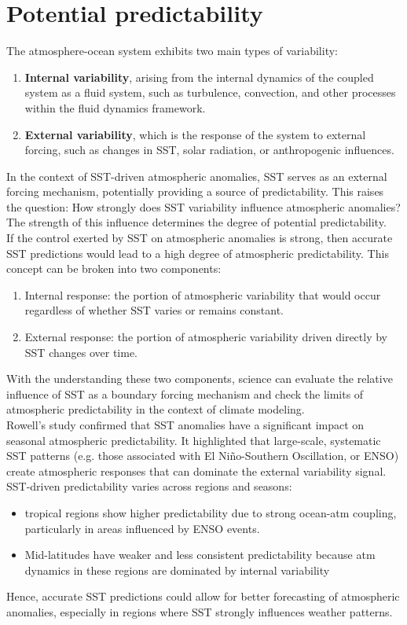 \section{Potential predictability} The atmosphere-ocean system exhibits two main types of variability: 
\begin{enumerate}
    \item \textbf{Internal variability}, arising from the internal dynamics of the coupled system as a fluid system, such as turbulence, convection, and other processes within the fluid dynamics framework.
    \item \textbf{External variability}, which is the response of the system to external forcing, such as changes in SST, solar radiation, or anthropogenic influences.
\end{enumerate}
In the context of SST-driven atmospheric anomalies, SST serves as an external forcing mechanism, potentially providing a source of predictability. This raises the question: How strongly does SST variability influence atmospheric anomalies? The strength of this influence determines the degree of potential predictability.\\

If the control exerted by SST on atmospheric anomalies is strong, then accurate SST predictions would lead to a high degree of atmospheric predictability. This concept can be broken into two components:
\begin{enumerate}
    \item Internal response: the portion of atmospheric variability that would occur regardless of whether SST varies or remains constant.
    \item External response: the portion of atmospheric variability driven directly by SST changes over time.
\end{enumerate}
With the understanding these two components, science can evaluate the relative influence of SST as a boundary forcing mechanism and check the limits of atmospheric predictability in the context of climate modeling. \\


Rowell's study confirmed that SST anomalies have a significant impact on seasonal atmospheric predictability. It highlighted that large-scale, systematic SST patterns (e.g. those associated with El Niño-Southern Oscillation, or ENSO) create atmospheric responses that can dominate the external variability signal.
SST-driven predictability varies across regions and seasons: 
\begin{itemize}
    \item tropical regions show higher predictability due to strong ocean-atm coupling, particularly in areas influenced by ENSO events.
    \item Mid-latitudes have weaker and less consistent predictability because atm dynamics in these regions are dominated by internal variability 
\end{itemize}
Hence, accurate SST predictions could allow for better forecasting of atmospheric anomalies, especially in regions where SST strongly influences weather patterns.\\
[0.2cm]


